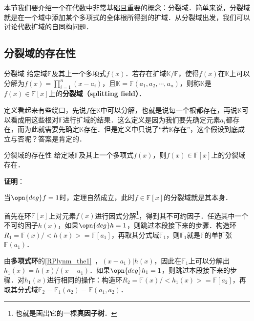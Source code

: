 



本节我们要介绍一个在代数中非常基础且重要的概念：分裂域．简单来说，分裂域就是在一个域中添加某个多项式的全体根所得到的扩域．从分裂域出发，我们可以讨论代数扩域的自同构问题．




\subsection{分裂域的存在性}


\begin{definition}{分裂域}
给定域$\mathbb{F}$及其上一个多项式$f(x)$．若存在扩域$\mathbb{K}/\mathbb{F}$，使得$f(x)$在$\mathbb{K}$上可以分解为$f(x)=\prod_{i=1}^n (x-a_i)$，且$\mathbb{K}=\mathbb{F}(a_1, a_2, \cdots, a_n)$，则称$\mathbb{K}$是$f(x)\in \mathbb{F}[x]$上的\textbf{分裂域（splitting field）}．
\end{definition}

定义看起来有些绕口，先说$f$在$\mathbb{K}$中可以分解，也就是说每一个根都存在，再说$\mathbb{K}$可以看成用这些根对$\mathbb{F}$进行扩域的结果．这么定义是因为我们要先确定元素$a_i$都存在，而为此就需要先确定$\mathbb{K}$存在．但是定义中只说了“若$\mathbb{K}$存在”，这个假设到底成立与否呢？答案是肯定的．

\begin{theorem}{分裂域的存在性}
给定域$\mathbb{F}$及其上一个多项式$f(x)$，则$f(x)\in \mathbb{F}[x]$上的分裂域存在．
\end{theorem}

\textbf{证明}：

当$\opn{deg}f=1$时，定理自然成立，此时$f\in\mathbb{F}[x]$的分裂域就是其本身．

首先在环$\mathbb{F}[x]$上对元素$f(x)$进行因式分解\footnote{也就是画出它的一棵\textbf{真因子树}．}，得到其不可约因子．任选其中一个不可约因子$h(x)$，如果$\opn{deg} h = 1$，则跳过本段接下来的步骤．构造环$R_1=\mathbb{F}(x)/<h(x)>=\mathbb{F}[a_1]$，再取其分式域$\mathbb{F}_1$，则$\mathbb{F}_1$就是$\mathbb{F}$的单扩张$\mathbb{F}(a_1)$．

由\textbf{多项式环}的\autoref{RPlynm_the1}~，$(x-a_1)|h(x)$，因此在$\mathbb{F}_1$上可以分解出$h_1(x)=h(x)/(x-a_1)$．如果$\opn{deg}h_1 = 1$，则跳过本段接下来的步骤．对$h_1(x)$进行相同的操作：构造环$R_2=\mathbb{F}(x)/<h_1(x)>=\mathbb{F}[a_2]$，再取其分式域$\mathbb{F}_2=\mathbb{F}_1(a_2)=\mathbb{F}(a_1, a_2)$．

